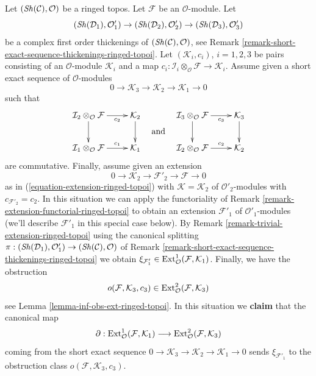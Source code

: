 \begin{remark}
\label{remark-complex-thickenings-and-ses-modules-ringed-topoi}
Let $(\mathop{\mathit{Sh}}\nolimits(\mathcal{C}), \mathcal{O})$ be a ringed topos.
Let $\mathcal{F}$ be an $\mathcal{O}$-module. Let
$$
(\mathop{\mathit{Sh}}\nolimits(\mathcal{D}_1), \mathcal{O}'_1) \to
(\mathop{\mathit{Sh}}\nolimits(\mathcal{D}_2), \mathcal{O}'_2) \to
(\mathop{\mathit{Sh}}\nolimits(\mathcal{D}_3), \mathcal{O}'_3)
$$
be a complex first order thickenings of $(\mathop{\mathit{Sh}}\nolimits(\mathcal{C}), \mathcal{O})$, see
Remark \ref{remark-short-exact-sequence-thickenings-ringed-topoi}.
Let $(\mathcal{K}_i, c_i)$, $i = 1, 2, 3$ be pairs consisting of
an $\mathcal{O}$-module $\mathcal{K}_i$ and a map
$c_i : \mathcal{I}_i \otimes_\mathcal{O} \mathcal{F} \to
\mathcal{K}_i$. Assume given a short exact sequence
of $\mathcal{O}$-modules
$$
0 \to \mathcal{K}_3 \to \mathcal{K}_2 \to \mathcal{K}_1 \to 0
$$
such that
$$
\vcenter{
\xymatrix{
\mathcal{I}_2 \otimes_\mathcal{O} \mathcal{F}
\ar[r]_-{c_2} \ar[d] &
\mathcal{K}_2 \ar[d] \\
\mathcal{I}_1 \otimes_\mathcal{O} \mathcal{F}
\ar[r]^-{c_1} &
\mathcal{K}_1
}
}
\quad\text{and}\quad
\vcenter{
\xymatrix{
\mathcal{I}_3 \otimes_\mathcal{O} \mathcal{F}
\ar[r]_-{c_3} \ar[d] &
\mathcal{K}_3 \ar[d] \\
\mathcal{I}_2 \otimes_\mathcal{O} \mathcal{F}
\ar[r]^-{c_2} &
\mathcal{K}_2
}
}
$$
are commutative. Finally, assume given an extension
$$
0 \to \mathcal{K}_2 \to \mathcal{F}'_2 \to \mathcal{F} \to 0
$$
as in (\ref{equation-extension-ringed-topoi})
with $\mathcal{K} = \mathcal{K}_2$
of $\mathcal{O}'_2$-modules with $c_{\mathcal{F}'_2} = c_2$.
In this situation we can apply the functoriality of
Remark \ref{remark-extension-functorial-ringed-topoi}
to obtain an extension $\mathcal{F}'_1$ of $\mathcal{O}'_1$-modules
(we'll describe $\mathcal{F}'_1$ in this special case below). By
Remark \ref{remark-trivial-extension-ringed-topoi}
using the canonical splitting
$\pi : (\mathop{\mathit{Sh}}\nolimits(\mathcal{D}_1), \mathcal{O}'_1) \to
(\mathop{\mathit{Sh}}\nolimits(\mathcal{C}), \mathcal{O})$ of
Remark \ref{remark-short-exact-sequence-thickenings-ringed-topoi}
we obtain
$\xi_{\mathcal{F}'_1} \in
\mathop{\mathrm{Ext}}\nolimits^1_\mathcal{O}(\mathcal{F}, \mathcal{K}_1)$.
Finally, we have the obstruction
$$
o(\mathcal{F}, \mathcal{K}_3, c_3) \in
\mathop{\mathrm{Ext}}\nolimits^2_\mathcal{O}(\mathcal{F}, \mathcal{K}_3)
$$
see Lemma \ref{lemma-inf-obs-ext-ringed-topoi}.
In this situation we {\bf claim} that the canonical map
$$
\partial :
\mathop{\mathrm{Ext}}\nolimits^1_\mathcal{O}(\mathcal{F}, \mathcal{K}_1)
\longrightarrow
\mathop{\mathrm{Ext}}\nolimits^2_\mathcal{O}(\mathcal{F}, \mathcal{K}_3)
$$
coming from the short exact sequence
$0 \to \mathcal{K}_3 \to \mathcal{K}_2 \to \mathcal{K}_1 \to 0$
sends $\xi_{\mathcal{F}'_1}$
to the obstruction class $o(\mathcal{F}, \mathcal{K}_3, c_3)$.


\end{remark}

